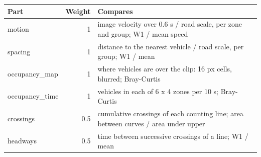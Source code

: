 \begin{tabular}{|l|r|p{9cm}|}
\hline
\textbf{Part} & \textbf{Weight} & \textbf{Compares} \\
\hline
motion & 1 & image velocity over 0.6 s / road scale, per zone and group; W1 / mean speed \\
spacing & 1 & distance to the nearest vehicle / road scale, per group; W1 / mean \\
occupancy\_map & 1 & where vehicles are over the clip: 16 px cells, blurred; Bray-Curtis \\
occupancy\_time & 1 & vehicles in each of 6 x 4 zones per 10 s; Bray-Curtis \\
crossings & 0.5 & cumulative crossings of each counting line; area between curves / area under upper \\
headways & 0.5 & time between successive crossings of a line; W1 / mean \\
\hline
\end{tabular}
